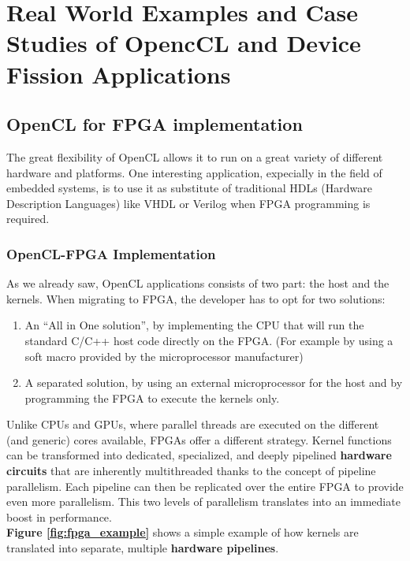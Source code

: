
\section{Real World Examples and Case Studies of OpencCL and Device Fission Applications}


\subsection{OpenCL for FPGA implementation}
The great flexibility of OpenCL allows it to run on a great variety of different hardware and platforms. One interesting application, expecially in the field of embedded systems, is to use it as substitute of traditional HDLs (Hardware Description Languages) like VHDL or Verilog when FPGA programming is required.

\subsubsection{OpenCL-FPGA Implementation}
As we already saw, OpenCL applications consists of two part: the host and the kernels.
When migrating to FPGA, the developer has to opt for two solutions:

\begin{enumerate}
	\item An ``All in One solution'', by implementing the CPU that will run the standard C/C++ host code directly on the FPGA. (For example by using a soft macro provided by the microprocessor manufacturer)
	\item A separated solution, by using an external microprocessor for the host and by programming the FPGA to execute the kernels only.
	\end{enumerate}
	
Unlike CPUs and GPUs, where parallel threads are executed on the different (and generic) cores available, FPGAs offer a different strategy. Kernel functions can be transformed into dedicated, specialized, and deeply pipelined \textbf{hardware circuits} that are inherently multithreaded thanks to the concept of pipeline parallelism. Each pipeline can then be replicated over the entire FPGA to provide even more parallelism. This two levels of parallelism translates into an immediate boost in performance.\\
\textbf{Figure \ref {fig:fpga_example}} shows a simple example of how kernels are translated into separate, multiple \textbf{hardware pipelines}.
	
